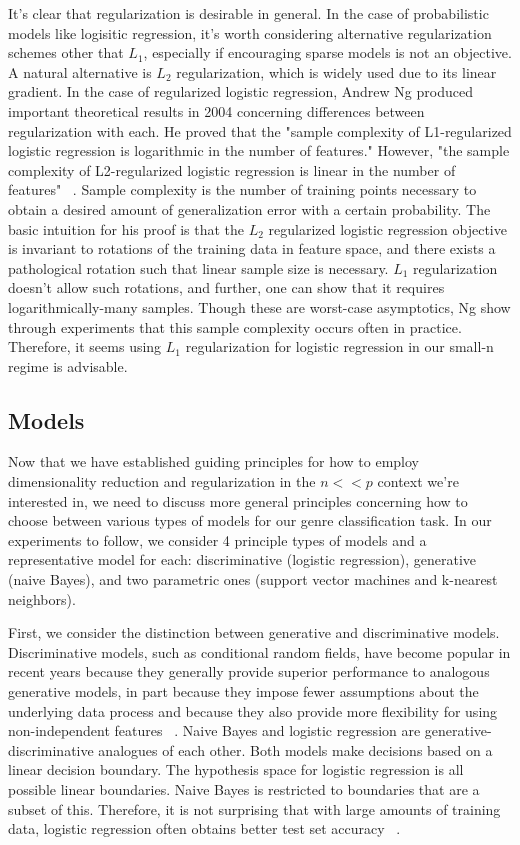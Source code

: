 \documentclass[]{article}
\begin{document}
	It's clear that regularization is desirable in general. In the case of probabilistic models like logisitic regression, it's worth considering alternative regularization schemes other that $L_1$, especially if encouraging sparse models is not an objective. A natural alternative is $L_2$ regularization, which is widely used due to its linear gradient. In the case of regularized logistic regression, Andrew Ng produced important theoretical results in 2004 concerning differences between regularization with each. He proved that the "sample complexity of L1-regularized logistic regression is logarithmic in the number of features." However,  "the sample complexity of L2-regularized logistic regression is linear in the number of features"  ~\cite{ng2004feature}. Sample complexity is the number of training points necessary to obtain a desired amount of generalization error with a certain probability. The basic intuition for his proof is that the $L_2$ regularized logistic regression objective is invariant to rotations of the training data in feature space, and there exists a pathological rotation such that linear sample size is necessary. $L_1$ regularization doesn't allow such rotations, and further, one can show that it requires logarithmically-many samples. Though these are worst-case asymptotics, Ng show through experiments that  this sample complexity occurs often in practice. Therefore, it seems using $L_1$ regularization for logistic regression in our small-n regime is advisable. 
\subsection{Models}
	Now that we have established guiding principles for how to employ dimensionality reduction and regularization in the $n << p$ context we're interested in, we need to discuss more general principles concerning how to choose between various types of models for our genre classification task. In our experiments to follow, we consider 4 principle types of models and a representative model for each: discriminative (logistic regression), generative (naive Bayes), and two parametric ones (support vector machines and k-nearest neighbors). 

	First, we consider the distinction between generative and discriminative models. Discriminative models, such as conditional random fields, have become popular in recent years because they generally provide superior performance to analogous generative models, in part because they impose fewer assumptions about the underlying data process and because they also provide more flexibility for using non-independent features ~\cite{lafferty2001conditional}. Naive Bayes and logistic regression are generative-discriminative analogues of each other. Both models make decisions based on a linear decision boundary. The hypothesis space for logistic regression is all possible linear boundaries. Naive Bayes is restricted to boundaries that are a subset of this. Therefore, it is not surprising that with large amounts of training data, logistic regression often obtains better test set accuracy ~\cite{jordan2002discriminative}. 	
	
\end{document}
